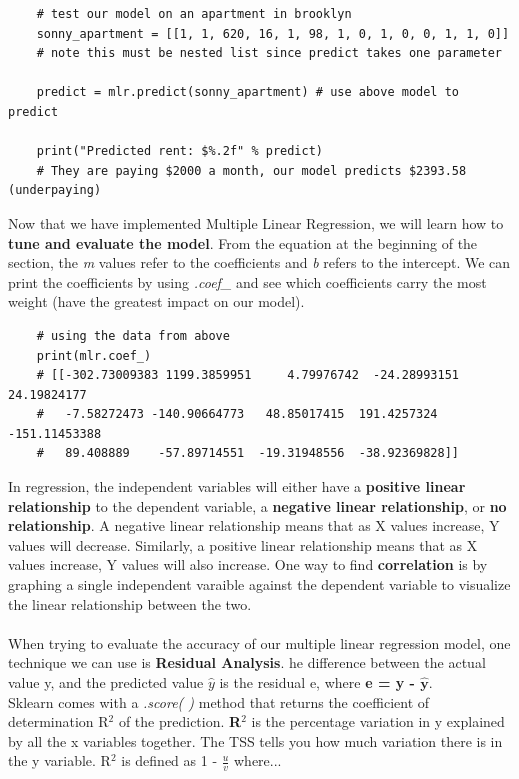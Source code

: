 \documentclass[11pt, a4paper]{article}
\begin{document}
\begin{spacing}{1.1}
\begin{lstlisting}
	# test our model on an apartment in brooklyn
	sonny_apartment = [[1, 1, 620, 16, 1, 98, 1, 0, 1, 0, 0, 1, 1, 0]]
	# note this must be nested list since predict takes one parameter
	
	predict = mlr.predict(sonny_apartment) # use above model to predict
	
	print("Predicted rent: $%.2f" % predict)
	# They are paying $2000 a month, our model predicts $2393.58 (underpaying)	\end{lstlisting} \newpage
	
	\noindent Now that we have implemented Multiple Linear Regression, we will learn how to \textbf{tune and evaluate the model}. From the equation at the beginning of the section, the \textit{m} values refer to the coefficients and \textit{b} refers to the intercept. We can print the coefficients by using \textit{.coef\_} and see which coefficients carry the most weight (have the greatest impact on our model).
	\begin{lstlisting}
	# using the data from above
	print(mlr.coef_)
	# [[-302.73009383 1199.3859951     4.79976742  -24.28993151   24.19824177
	#   -7.58272473 -140.90664773   48.85017415  191.4257324  -151.11453388
	#   89.408889    -57.89714551  -19.31948556  -38.92369828]]	\end{lstlisting}\vspace*{1mm}
	In regression, the independent variables will either have a \textbf{positive linear relationship} to the dependent variable, a \textbf{negative linear relationship}, or \textbf{no relationship}. A negative linear relationship means that as X values increase, Y values will decrease. Similarly, a positive linear relationship means that as X values increase, Y values will also increase. One way to find \textbf{correlation} is by graphing a single independent varaible against the dependent variable to visualize the linear relationship between the two. \\~\\
	When trying to evaluate the accuracy of our multiple linear regression model, one technique we can use is \textbf{Residual Analysis}. he difference between the actual value y, and the predicted value $\hat{y}$ is the residual e, where \textbf{e = y - $\mathbf{\hat{y}}$}. \vspace*{1.5mm} \\
	Sklearn comes with a \textit{.score( )} method that returns the coefficient of determination R$^2$ of the prediction. \textbf{R$^2$} is the percentage variation in y explained by all the x variables together. The TSS tells you how much variation there is in the y variable. R$^2$ is defined as 1 - $\frac{u}{v}$ where... \vspace*{1mm} \\

\end{spacing}
\end{document}
